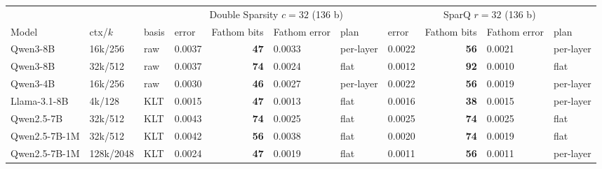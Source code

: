 \begin{tabular}{llllrlllrll}
\toprule
 & & & \multicolumn{4}{c}{Double Sparsity $c{=}32$ (136 b)} & \multicolumn{4}{c}{SparQ $r{=}32$ (136 b)} \\
Model & ctx/$k$ & basis & error & Fathom bits & Fathom error & plan & error & Fathom bits & Fathom error & plan \\
\midrule
Qwen3-8B & 16k/256 & raw & 0.0037 & \textbf{47} & 0.0033 & per-layer & 0.0022 & \textbf{56} & 0.0021 & per-layer \\
Qwen3-8B & 32k/512 & raw & 0.0037 & \textbf{74} & 0.0024 & flat & 0.0012 & \textbf{92} & 0.0010 & flat \\
Qwen3-4B & 16k/256 & raw & 0.0030 & \textbf{46} & 0.0027 & per-layer & 0.0022 & \textbf{56} & 0.0019 & per-layer \\
Llama-3.1-8B & 4k/128 & KLT & 0.0015 & \textbf{47} & 0.0013 & flat & 0.0016 & \textbf{38} & 0.0015 & per-layer \\
Qwen2.5-7B & 32k/512 & KLT & 0.0043 & \textbf{74} & 0.0025 & flat & 0.0025 & \textbf{74} & 0.0025 & flat \\
Qwen2.5-7B-1M & 32k/512 & KLT & 0.0042 & \textbf{56} & 0.0038 & flat & 0.0020 & \textbf{74} & 0.0019 & flat \\
Qwen2.5-7B-1M & 128k/2048 & KLT & 0.0024 & \textbf{47} & 0.0019 & flat & 0.0011 & \textbf{56} & 0.0011 & per-layer \\
\bottomrule
\end{tabular}